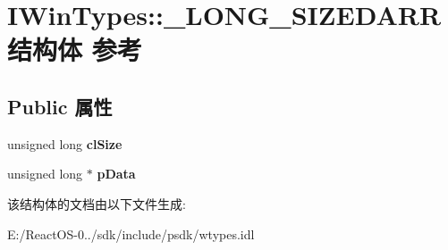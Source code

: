 \hypertarget{struct_i_win_types_1_1___l_o_n_g___s_i_z_e_d_a_r_r}{}\section{I\+Win\+Types\+:\+:\+\_\+\+L\+O\+N\+G\+\_\+\+S\+I\+Z\+E\+D\+A\+R\+R结构体 参考}
\label{struct_i_win_types_1_1___l_o_n_g___s_i_z_e_d_a_r_r}
\subsection*{Public 属性}
\begin{DoxyCompactItemize}
\item 
\mbox{\label{struct_i_win_types_1_1___l_o_n_g___s_i_z_e_d_a_r_r_ad8949fcdb963fbfb5c32086444ff751f}} 
unsigned long {\bfseries cl\+Size}
\item 
\mbox{\label{struct_i_win_types_1_1___l_o_n_g___s_i_z_e_d_a_r_r_a5d81fbe9d05509a062512b5508ed6ad9}} 
unsigned long $\ast$ {\bfseries p\+Data}
\end{DoxyCompactItemize}


该结构体的文档由以下文件生成\+:\begin{DoxyCompactItemize}
\item 
E\+:/\+React\+O\+S-\/0../sdk/include/psdk/wtypes.\+idl\end{DoxyCompactItemize}
